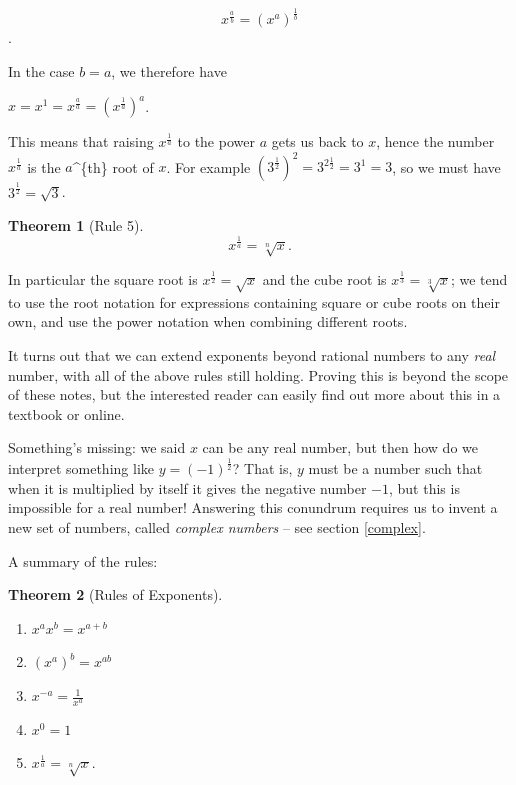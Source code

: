 \documentclass[
]{book}
\providecommand{\tightlist}{%
  \setlength{\itemsep}{0pt}\setlength{\parskip}{0pt}}
\newtheorem{theorem}{Theorem}[chapter]
\theoremstyle{definition}
\theoremstyle{definition}
\theoremstyle{definition}
\theoremstyle{definition}
\theoremstyle{remark}
\begin{document}
\[x^{\frac{a}{b}}=(x^a)^{\frac{1}{b}}\].

In the case \(b=a\), we therefore have

\(x=x^1=x^{\frac{a}{a}}=(x^{\frac{1}{a}})^a\).

This means that raising \(x^\frac{1}{a}\) to the power \(a\) gets us back to \(x\), hence the number \(x^\frac{1}{a}\) is the \(a\)\^{}\{th\} root of \(x\). For example \((3^\frac{1}{2})^2=3^{2\frac{1}{2}}=3^1=3\), so we must have \(3^\frac{1}{2}=\sqrt{3}\).

\begin{theorem}[Rule 5]
\[x^{\frac{1}{a}}=\sqrt[n]{x}.\]
\end{theorem}

In particular the square root is \(x^{\frac{1}{2}}=\sqrt{x}\) and the cube root is \(x^{\frac{1}{3}}=\sqrt[3]{x}\); we tend to use the root notation for expressions containing square or cube roots on their own, and use the power notation when combining different roots.

It turns out that we can extend exponents beyond rational numbers to any \emph{real} number, with all of the above rules still holding. Proving this is beyond the scope of these notes, but the interested reader can easily find out more about this in a textbook or online.

Something's missing: we said \(x\) can be any real number, but then how do we interpret something like \(y=(-1)^\frac{1}{2}\)? That is, \(y\) must be a number such that when it is multiplied by itself it gives the negative number \(-1\), but this is impossible for a real number! Answering this conundrum requires us to invent a new set of numbers, called \emph{complex numbers} -- see section \ref{complex}.

A summary of the rules:

\begin{theorem}[Rules of Exponents]
\protect\hypertarget{thm:exprules}{}\label{thm:exprules}

\begin{enumerate}
\def\labelenumi{\arabic{enumi}.}
\tightlist
\item
  \(x^ax^b=x^{a+b}\)
\item
  \((x^a)^b=x^{ab}\)
\item
  \(x^{-a}=\frac{1}{x^a}\)
\item
  \(x^0=1\)
\item
  \(x^{\frac{1}{a}}=\sqrt[n]{x}.\)
\end{enumerate}

\end{theorem}
\end{document}
